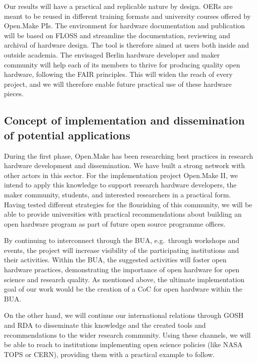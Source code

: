 \documentclass[
  12pt,
  a4paper,
]{article}
\begin{document}
Our results will have a practical and replicable nature by design. OERs
are meant to be reused in different training formats and university
courses offered by Open.Make PIs. The environment for hardware
documentation and publication will be based on FLOSS and streamline the
documentation, reviewing and archival of hardware design. The tool is
therefore aimed at users both inside and outside academia. The envisaged
Berlin hardware developer and maker community will help each of its
members to thrive for producing quality open hardware, following the
FAIR principles. This will widen the reach of every project, and we will
therefore enable future practical use of these hardware pieces.

\hypertarget{concept-of-implementation-and-dissemination-of-potential-applications}{%
\subsection{Concept of implementation and dissemination of potential
applications}\label{concept-of-implementation-and-dissemination-of-potential-applications}}

During the first phase, Open.Make has been researching best practices in
research hardware development and dissemination. We have built a strong
network with other actors in this sector. For the implementation project
Open.Make II, we intend to apply this knowledge to support research
hardware developers, the maker community, students, and interested
researchers in a practical form. Having tested different strategies for
the flourishing of this community, we will be able to provide
universities with practical recommendations about building an open
hardware program as part of future open source programme offices.

By continuing to interconnect through the BUA, e.g.~through workshops
and events, the project will increase visibility of the participating
institutions and their activities. Within the BUA, the suggested
activities will foster open hardware practices, demonstrating the
importance of open hardware for open science and research quality. As
mentioned above, the ultimate implementation goal of our work would be
the creation of a CoC for open hardware within the BUA.

On the other hand, we will continue our international relations through
GOSH and RDA to disseminate this knowledge and the created tools and
recommendations to the wider research community. Using these channels,
we will be able to reach to institutions implementing open science
policies (like NASA TOPS or CERN), providing them with a practical
example to follow.
\end{document}
